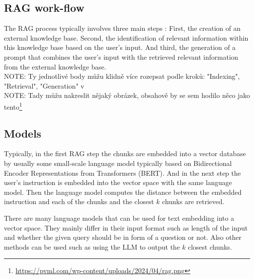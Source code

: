\subsection{RAG work-flow}

The RAG process typically involves three main steps \cite{Gao2023}: First, the creation of an external knowledge base. Second, the identification of relevant information within this knowledge base based on the user's input. And third, the generation of a prompt that combines the user's input with the retrieved relevant information from the external knowledge base. \\

NOTE: Ty jednotlivé body můžu klidně více rozepsat podle kroků: "Indexing", "Retrieval", "Generation" v \cite{Gao2023} \\

NOTE: Tady můžu nakreslit nějaký obrázek, obsahově by se sem hodilo něco jako tento\footnote{\url{https://pvml.com/wp-content/uploads/2024/04/rag.png}}


\subsection{Models}

Typically, in the first RAG step the chunks are embedded into a vector database by usually some small-scale language model typically based on Bidirectional Encoder Representations from Transformers (BERT). And in the next step the user's instruction is embedded into the vector space with the same language model. Then the language model computes the distance between the embedded instruction and each of the chunks and the closest $k$ chunks are retrieved.

There are many language models that can be used for text embedding into a vector space. They mainly differ in their input format such as length of the input and whether the given query should be in form of a question or not. Also other methods can be used such as using the LLM to output the $k$ closest chunks.
